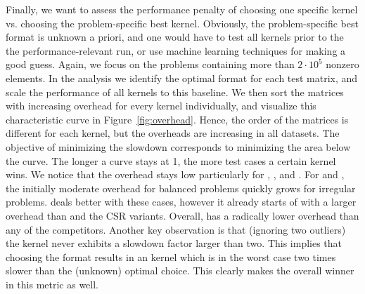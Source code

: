 Finally, we want to assess the performance penalty of choosing one specific kernel
vs. choosing the problem-specific best kernel.
Obviously, the problem-specific best format is unknown a priori, and one would have 
to test all kernels prior to the the performance-relevant run, or use machine learning techniques
for making a good guess. 
Again, we focus on the problems containing more than $2\cdot 10^5$ nonzero elements.
In the analysis we identify the optimal format for each test matrix,
and scale the performance of all kernels to this baseline.
We then sort the matrices with increasing overhead for every kernel
individually, and visualize this characteristic curve in
Figure~\ref{fig:overhead}. 
Hence, the order of the matrices is different for each kernel,
but the overheads are increasing in all datasets.
The objective of minimizing the slowdown corresponds to minimizing the area
below the curve. The longer a curve stays at 1, the more test cases a certain
kernel wins.
We notice that the overhead stays low particularly for \coo, \csri, and \csrfive.
For \sellp and \csr, the initially moderate overhead for balanced problems 
quickly grows for irregular problems.
\hyb deals better with these cases, however it already starts of with a larger overhead than 
\coo and the CSR variants.
Overall, \coo has a radically lower overhead than any of the competitors.
Another key observation is that (ignoring two outliers) the \coo kernel never
exhibits a slowdown factor larger than two. This implies that choosing the \coo
format results in an \spmv kernel which is in the worst case two times slower
than the (unknown) optimal choice. 
This clearly makes \coo the overall winner in this metric as well.

